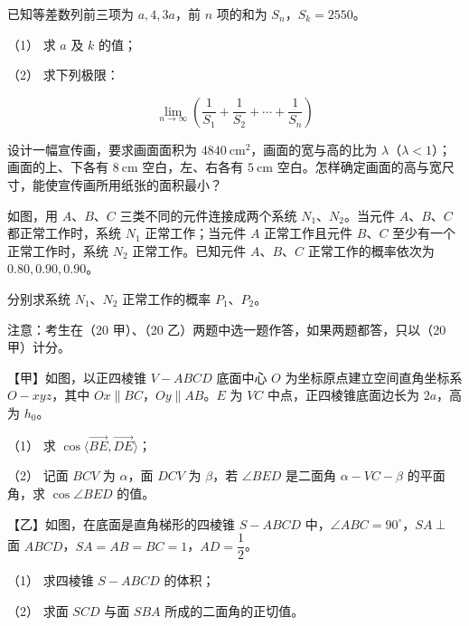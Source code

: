 \begin{question}
已知等差数列前三项为 $a,4,3a$，前 $n$ 项的和为 $S_n$，$S_k=2550$。

（1） 求 $a$ 及 $k$ 的值；

（2） 求下列极限：

\nopagebreak[4]
\[
\lim_{n\to\infty}\left(\frac1{S_1}+\frac1{S_2}+\cdots+\frac1{S_n}\right)
\]

\end{question}
\begin{question}
设计一幅宣传画，要求画面面积为 $4840\ \mathrm{cm}^2$，画面的宽与高的比为 $\lambda$（$\lambda<1$）；画面的上、下各有 $8\ \mathrm{cm}$ 空白，左、右各有 $5\ \mathrm{cm}$ 空白。怎样确定画面的高与宽尺寸，能使宣传画所用纸张的面积最小？

\Needspace{0.4\textheight}
\end{question}
\begin{question}
如图，用 $A$、$B$、$C$ 三类不同的元件连接成两个系统 $N_1$、$N_2$。当元件 $A$、$B$、$C$ 都正常工作时，系统 $N_1$ 正常工作；当元件 $A$ 正常工作且元件 $B$、$C$ 至少有一个正常工作时，系统 $N_2$ 正常工作。已知元件 $A$、$B$、$C$ 正常工作的概率依次为 $0.80,0.90,0.90$。
\nopagebreak[4]
\begin{center}\end{center}
\nopagebreak[4]
分别求系统 $N_1$、$N_2$ 正常工作的概率 $P_1$、$P_2$。

\Needspace{0.4\textheight}
\end{question}
\begin{question}
注意：考生在（20 甲）、（20 乙）两题中选一题作答，如果两题都答，只以（20 甲）计分。

【甲】如图，以正四棱锥 $V-ABCD$ 底面中心 $O$ 为坐标原点建立空间直角坐标系 $O-xyz$，其中 $Ox\parallel BC$，$Oy\parallel AB$。$E$ 为 $VC$ 中点，正四棱锥底面边长为 $2a$，高为 $h_0$。
\nopagebreak[4]
\begin{center}\end{center}
\nopagebreak[4]
（1） 求 $\cos\langle\overrightarrow{BE},\overrightarrow{DE}\rangle$；

（2） 记面 $BCV$ 为 $\alpha$，面 $DCV$ 为 $\beta$，若 $\angle BED$ 是二面角 $\alpha-VC-\beta$ 的平面角，求 $\cos\angle BED$ 的值。

【乙】如图，在底面是直角梯形的四棱锥 $S-ABCD$ 中，$\angle ABC=90^\circ$，$SA\perp$ 面 $ABCD$，$SA=AB=BC=1$，$AD=\dfrac12$。
\nopagebreak[4]
\begin{center}\end{center}
\nopagebreak[4]
（1） 求四棱锥 $S-ABCD$ 的体积；

（2） 求面 $SCD$ 与面 $SBA$ 所成的二面角的正切值。

\end{question}

